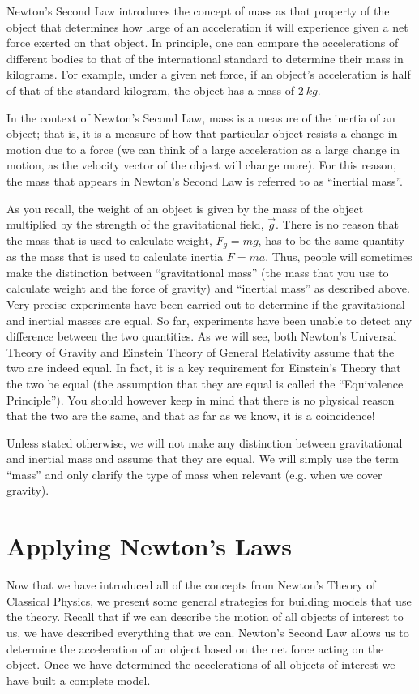 Newton's Second Law introduces the concept of mass as that property of the object that determines how large of an acceleration it will experience given a net force exerted on that object. In principle, one can compare the accelerations of different bodies to that of the international standard to determine their mass in kilograms. For example, under a given net force, if an object's acceleration is half of that of the standard kilogram, the object has a mass of $\SI{2}{kg}$. 

In the context of Newton's Second Law, mass is a measure of the inertia of an object; that is, it is a measure of how that particular object resists a change in motion due to a force (we can think of a large acceleration as a large change in motion, as the velocity vector of the object will change more). For this reason, the mass that appears in Newton's Second Law is referred to as ``inertial mass''.

As you recall, the weight of an object is given by the mass of the object multiplied by the strength of the gravitational field, $\vec g$. There is no reason that the mass that is used to calculate weight, $F_g=mg$, has to be the same quantity as the mass that is used to calculate inertia $F=ma$. Thus, people will sometimes make the distinction between ``gravitational mass'' (the mass that you use to calculate weight and the force of gravity) and ``inertial mass'' as described above. Very precise experiments have been carried out to determine if the gravitational and inertial masses are equal. So far, experiments have been unable to detect any difference between the two quantities. As we will see, both Newton's Universal Theory of Gravity and Einstein Theory of General Relativity assume that the two are indeed equal. In fact, it is a key requirement for Einstein's Theory that the two be equal (the assumption that they are equal is called the ``Equivalence Principle''). You should however keep in mind that there is no physical reason that the two are the same, and that as far as we know, it is a coincidence!

Unless stated otherwise, we will not make any distinction between gravitational and inertial mass and assume that they are equal. We will simply use the term ``mass'' and only clarify the type of mass when relevant (e.g. when we cover gravity).

\section{Applying Newton's Laws}
Now that we have introduced all of the concepts from Newton's Theory of Classical Physics, we present some general strategies for building models that use the theory. Recall that if we can describe the motion of all objects of interest to us, we have described everything that we can. Newton's Second Law allows us to determine the acceleration of an object based on the net force acting on the object. Once we have determined the accelerations of all objects of interest we have built a complete model. 

